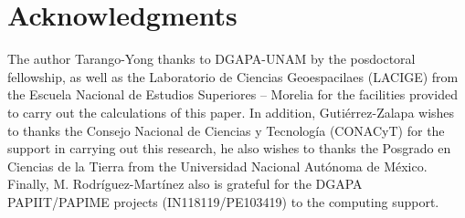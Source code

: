 \documentclass[times,twocolumn,final,authoryear]{elsarticle}
\begin{document}


\section{Acknowledgments}
The author Tarango-Yong thanks to DGAPA-UNAM by the posdoctoral fellowship, as well as the Laboratorio de Ciencias Geoespacilaes (LACIGE) from the Escuela Nacional de Estudios Superiores -- Morelia for the facilities provided to carry out the calculations of this paper. In addition, Gutiérrez-Zalapa wishes to thanks the
Consejo Nacional de Ciencias y Tecnología (CONACyT) for the support in carrying out this research, he also wishes to thanks the Posgrado en Ciencias de la Tierra from the Universidad Nacional Autónoma de México. Finally, M. Rodr\'iguez-Mart\'inez also is grateful for the DGAPA PAPIIT/PAPIME projects (IN118119/PE103419) to the computing support.
%



\end{document}
